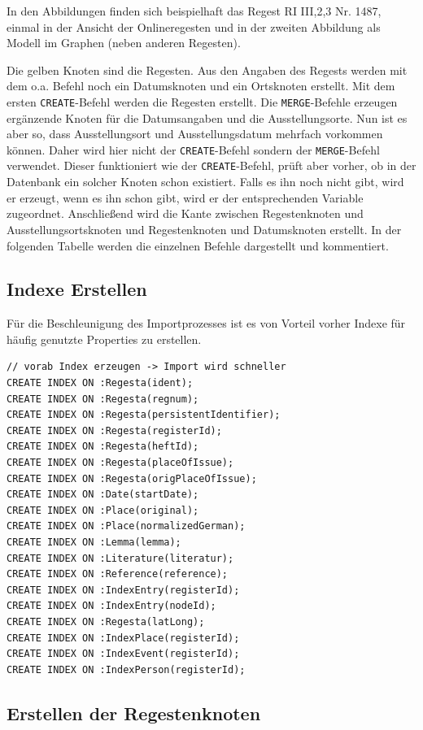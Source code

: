 \documentclass[ngerman,]{scrreprt}
\begin{document}
In den Abbildungen finden sich beispielhaft das Regest RI III,2,3 Nr. 1487, einmal in der Ansicht der Onlineregesten und in der zweiten Abbildung als Modell im Graphen (neben anderen Regesten).

Die gelben Knoten sind die Regesten. Aus den Angaben des Regests werden mit dem o.a. Befehl noch ein Datumsknoten und ein Ortsknoten erstellt. Mit dem ersten \texttt{CREATE}-Befehl werden die Regesten erstellt. Die \texttt{MERGE}-Befehle erzeugen ergänzende Knoten für die Datumsangaben und die Ausstellungsorte. Nun ist es aber so, dass Ausstellungsort und Ausstellungsdatum mehrfach vorkommen können. Daher wird hier nicht der \texttt{CREATE}-Befehl sondern der \texttt{MERGE}-Befehl verwendet. Dieser funktioniert wie der \texttt{CREATE}-Befehl, prüft aber vorher, ob in der Datenbank ein solcher Knoten schon existiert. Falls es ihn noch nicht gibt, wird er erzeugt, wenn es ihn schon gibt, wird er der entsprechenden Variable zugeordnet. Anschließend wird die Kante zwischen Regestenknoten und Ausstellungsortsknoten und Regestenknoten und Datumsknoten erstellt. In der folgenden Tabelle werden die einzelnen Befehle dargestellt und kommentiert.

\subsection{Indexe Erstellen}\label{indexe-erstellen}

Für die Beschleunigung des Importprozesses ist es von Vorteil vorher Indexe für häufig genutzte Properties zu erstellen.

\begin{verbatim}
// vorab Index erzeugen -> Import wird schneller
CREATE INDEX ON :Regesta(ident);
CREATE INDEX ON :Regesta(regnum);
CREATE INDEX ON :Regesta(persistentIdentifier);
CREATE INDEX ON :Regesta(registerId);
CREATE INDEX ON :Regesta(heftId);
CREATE INDEX ON :Regesta(placeOfIssue);
CREATE INDEX ON :Regesta(origPlaceOfIssue);
CREATE INDEX ON :Date(startDate);
CREATE INDEX ON :Place(original);
CREATE INDEX ON :Place(normalizedGerman);
CREATE INDEX ON :Lemma(lemma);
CREATE INDEX ON :Literature(literatur);
CREATE INDEX ON :Reference(reference);
CREATE INDEX ON :IndexEntry(registerId);
CREATE INDEX ON :IndexEntry(nodeId);
CREATE INDEX ON :Regesta(latLong);
CREATE INDEX ON :IndexPlace(registerId);
CREATE INDEX ON :IndexEvent(registerId);
CREATE INDEX ON :IndexPerson(registerId);
\end{verbatim}

\subsection{Erstellen der Regestenknoten}\label{erstellen-der-regestenknoten}
\end{document}
